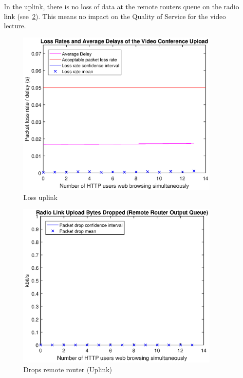 \documentclass[a4paper,10pt]{book}\usepackage{graphicx}
\begin{document}
In the uplink, there is no loss of data at the remote routers queue on the radio link (see~\ref{fig:remoteRdrops}).
This means no impact on the Quality of Service for the video lecture.
\begin{figure}[!ht]
  \begin{center}
  \includegraphics[width=0.9\textwidth]{off_loss_conf_upload.eps}
    \caption{Loss uplink}
     \label{fig:losslecup}
     \end{center}
\end{figure}

\begin{figure}[!ht]
  \begin{center}
    \includegraphics[width=0.9\textwidth]{off_remote_router_drops.eps}
    \caption{Drops remote router (Uplink)}
     \label{fig:remoteRdrops}
     \end{center}
\end{figure}
\end{document}
